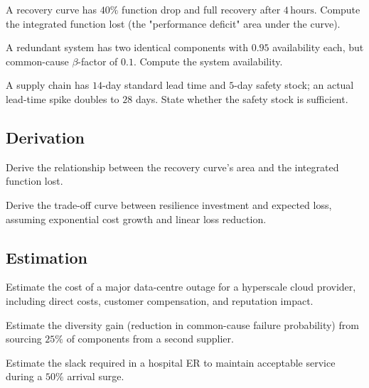\begin{exercise}
A recovery curve has $40\%$ function drop and full recovery after $4\,\text{hours}$. Compute the integrated function lost (the "performance deficit" area under the curve).
\end{exercise}

\begin{exercise}
A redundant system has two identical components with $0.95$ availability each, but common-cause $\beta$-factor of $0.1$. Compute the system availability.
\end{exercise}

\begin{exercise}
A supply chain has $14$-day standard lead time and $5$-day safety stock; an actual lead-time spike doubles to $28$ days. State whether the safety stock is sufficient.
\end{exercise}

\subsection*{Derivation}

\begin{exercise}
Derive the relationship between the recovery curve's area and the integrated function lost.
\end{exercise}

\begin{exercise}
Derive the trade-off curve between resilience investment and expected loss, assuming exponential cost growth and linear loss reduction.
\end{exercise}

\subsection*{Estimation}

\begin{exercise}
Estimate the cost of a major data-centre outage for a hyperscale cloud provider, including direct costs, customer compensation, and reputation impact.
\end{exercise}

\begin{exercise}
Estimate the diversity gain (reduction in common-cause failure probability) from sourcing $25\%$ of components from a second supplier.
\end{exercise}

\begin{exercise}
Estimate the slack required in a hospital ER to maintain acceptable service during a $50\%$ arrival surge.
\end{exercise}

